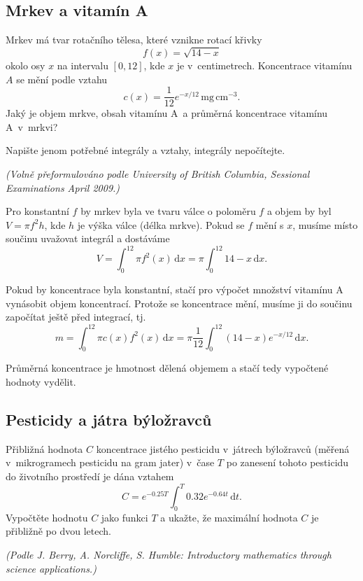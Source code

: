 
\subsection{Mrkev a vitamín A}  Mrkev má tvar rotačního tělesa, které
vznikne rotací křivky $$f(x)=\sqrt{14-x}$$ okolo osy $x$ na intervalu
$[0,12]$, kde $x$ je v~centimetrech. Koncentrace vitamínu $A$ se mění
podle vztahu
$$c(x)=\frac 1{12}e^{-x/12} \,\mathrm{mg}\,\mathrm{cm}^{-3}.$$ Jaký je
objem mrkve, obsah vitamínu A a průměrná koncentrace vitamínu A v mrkvi?

Napište jenom potřebné integrály a vztahy, integrály nepočítejte.

\textit{(Volně přeformulováno podle University of British Columbia,
  Sessional Examinations April 2009.)}

\reseni
Pro konstantní $f$ by mrkev byla ve tvaru válce o poloměru $f$ a objem by byl $V=\pi f^2 h$, kde $h$ je výška válce (délka mrkve). Pokud se $f$ mění s $x$, musíme místo součinu uvažovat integrál a dostáváme
$$V=\int_0^{12} \pi f^2(x)\,\mathrm dx=\pi\int_0^{12} 14-x\,\mathrm dx.$$

Pokud by koncentrace byla konstantní, stačí pro výpočet množství vitamínu A vynásobit objem koncentrací. Protože se koncentrace mění, musíme ji do součinu započítat ještě před integrací, tj.
$$m=\int_0^{12} \pi c(x)f^2(x)\,\mathrm dx=\pi \frac 1{12}\int_0^{12} (14-x)e^{-x/12}\,\mathrm dx.$$

Průměrná koncentrace je hmotnost dělená objemem a stačí tedy vypočtené hodnoty vydělit.

\konec

\stranka

\def\mezera{\vspace*{-20pt}}

\subsection{Pesticidy a játra býložravců} Přibližná hodnota $C$ koncentrace
jistého pesticidu v~játrech býložravců (měřená v mikrogramech
pesticidu na gram jater) v čase $T$ po zanesení tohoto pesticidu do
životního prostředí je dána vztahem
$$C=e^{-0.25T}\int_0^T 0.32 e^{-0.64 t}\,\mathrm dt.$$
Vypočtěte hodnotu $C$ jako funkci $T$ a ukažte, že maximální hodnota
$C$ je přibližně po dvou letech. 



\textit{(Podle J. Berry, A. Norcliffe, S. Humble: Introductory mathematics through science applications.)}


